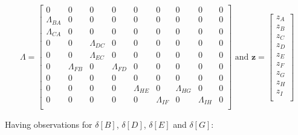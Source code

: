 \documentclass[12pt]{article}
\begin{document}
\[\Lambda = \begin{bmatrix}
                 0 & 0 & 0 & 0 & 0 & 0 & 0 & 0 & 0  \\
                 \Lambda_{BA} & 0 & 0 & 0 & 0 & 0 & 0 & 0 & 0  \\
                 \Lambda_{CA} & 0 & 0 & 0 & 0 & 0 & 0 & 0 & 0  \\
                 0 & 0 & \Lambda_{DC} & 0 & 0 & 0 & 0 & 0 & 0  \\
                 0 & 0 & \Lambda_{EC} & 0 & 0 & 0 & 0 & 0 & 0  \\
                 0 & \Lambda_{FB} & 0 & \Lambda_{FD} & 0 & 0 & 0 & 0 & 0  \\
                 0 & 0 & 0 & 0 & 0 & 0 & 0 & 0 & 0  \\
                 0 & 0 & 0 & 0 & \Lambda_{HE} & 0 & \Lambda_{HG} & 0 & 0  \\
                 0 & 0 & 0 & 0 & 0 & \Lambda_{IF} & 0 & \Lambda_{IH} & 0 \\
         \end{bmatrix} \text{ and }
    \textbf{z} = \begin{bmatrix}
                 z_A  \\
                 z_B  \\
                 z_C  \\
                 z_D  \\
                 z_E  \\
                 z_F  \\
                 z_G  \\
                 z_H  \\
                 z_I \\
         \end{bmatrix}
\]

Having observations for $\delta[B]$, $\delta[D]$, $\delta[E]$ and $\delta[G]$:
\end{document}
